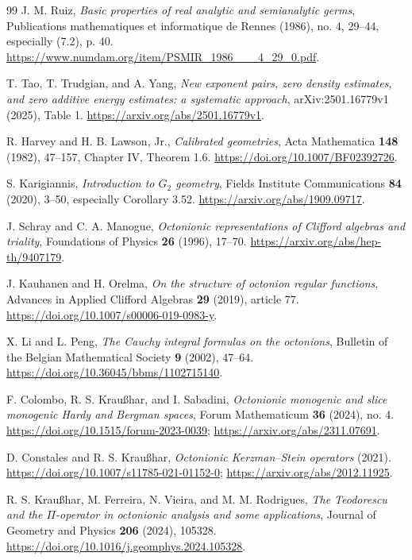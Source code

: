 \documentclass[11pt]{article}
\numberwithin{equation}{section}
\theoremstyle{definition}
\theoremstyle{remark}
\begin{document}
\begin{thebibliography}{99}
J. M. Ruiz,
\emph{Basic properties of real analytic and semianalytic germs},
Publications mathematiques et informatique de Rennes (1986), no. 4,
29--44, especially (7.2), p. 40.
\url{https://www.numdam.org/item/PSMIR_1986___4_29_0.pdf}.

T. Tao, T. Trudgian, and A. Yang,
\emph{New exponent pairs, zero density estimates, and zero additive
energy estimates: a systematic approach}, arXiv:2501.16779v1 (2025),
Table 1. \url{https://arxiv.org/abs/2501.16779v1}.

R. Harvey and H. B. Lawson, Jr.,
\emph{Calibrated geometries}, Acta Mathematica \textbf{148} (1982), 47--157,
Chapter IV, Theorem 1.6.
\url{https://doi.org/10.1007/BF02392726}.

S. Karigiannis, \emph{Introduction to $G_2$ geometry},
Fields Institute Communications \textbf{84} (2020), 3--50,
especially Corollary 3.52.
\url{https://arxiv.org/abs/1909.09717}.

J. Schray and C. A. Manogue,
\emph{Octonionic representations of Clifford algebras and triality},
Foundations of Physics \textbf{26} (1996), 17--70.
\url{https://arxiv.org/abs/hep-th/9407179}.

J. Kauhanen and H. Orelma, \emph{On the structure of octonion regular
functions}, Advances in Applied Clifford Algebras \textbf{29} (2019),
article 77. \url{https://doi.org/10.1007/s00006-019-0983-y}.

X. Li and L. Peng, \emph{The Cauchy integral formulas on the octonions},
Bulletin of the Belgian Mathematical Society \textbf{9} (2002), 47--64.
\url{https://doi.org/10.36045/bbms/1102715140}.

F. Colombo, R. S. Krau{\ss}har, and I. Sabadini,
\emph{Octonionic monogenic and slice monogenic Hardy and Bergman spaces},
Forum Mathematicum \textbf{36} (2024), no. 4.
\url{https://doi.org/10.1515/forum-2023-0039};
\url{https://arxiv.org/abs/2311.07691}.

D. Constales and R. S. Krau{\ss}har,
\emph{Octonionic Kerzman--Stein operators} (2021).
\url{https://doi.org/10.1007/s11785-021-01152-0};
\url{https://arxiv.org/abs/2012.11925}.

R. S. Krau{\ss}har, M. Ferreira, N. Vieira, and M. M. Rodrigues,
\emph{The Teodorescu and the $\Pi$-operator in octonionic analysis and
some applications}, Journal of Geometry and Physics \textbf{206}
(2024), 105328. \url{https://doi.org/10.1016/j.geomphys.2024.105328}.


\end{thebibliography}
\end{document}
